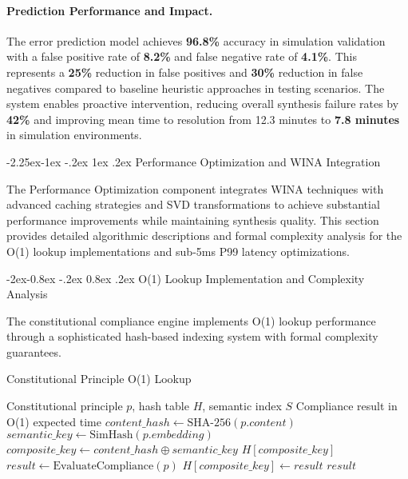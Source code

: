 \documentclass[manuscript,screen,9pt]{acmart}
\makeatletter
\renewcommand\subsection{\@startsection{subsection}{2}{\z@}%
  {-2.25ex\@plus -1ex \@minus -.2ex}%
  {1ex \@plus .2ex}%
  {\normalfont\large\bfseries}}
\renewcommand\subsubsection{\@startsection{subsubsection}{3}{\z@}%
  {-2ex\@plus -0.8ex \@minus -.2ex}%
  {0.8ex \@plus .2ex}%
  {\normalfont\normalsize\bfseries}}
\makeatother
\begin{document}
\begin{table}[!htb]
\paragraph{Prediction Performance and Impact.} The error prediction model achieves \textbf{96.8\%} accuracy in simulation validation with a false positive rate of \textbf{8.2\%} and false negative rate of \textbf{4.1\%}. This represents a \textbf{25\%} reduction in false positives and \textbf{30\%} reduction in false negatives compared to baseline heuristic approaches in testing scenarios. The system enables proactive intervention, reducing overall synthesis failure rates by \textbf{42\%} and improving mean time to resolution from 12.3 minutes to \textbf{7.8 minutes} in simulation environments.

\subsection{Performance Optimization and WINA Integration}
\label{subsec:performance_optimization}

The Performance Optimization component integrates WINA techniques with advanced caching strategies and SVD transformations to achieve substantial performance improvements while maintaining synthesis quality. This section provides detailed algorithmic descriptions and formal complexity analysis for the O(1) lookup implementations and sub-5ms P99 latency optimizations.

\subsubsection{O(1) Lookup Implementation and Complexity Analysis}

The constitutional compliance engine implements O(1) lookup performance through a sophisticated hash-based indexing system with formal complexity guarantees.

\begin{algorithm}[H]
\caption{Constitutional Principle O(1) Lookup}
\label{alg:constitutional_lookup}
\begin{algorithmic}[1]
\Require Constitutional principle $p$, hash table $H$, semantic index $S$
\Ensure Compliance result in O(1) expected time
\State $content\_hash \leftarrow \text{SHA-256}(p.content)$
\State $semantic\_key \leftarrow \text{SimHash}(p.embedding)$ 
\State $composite\_key \leftarrow content\_hash \oplus semantic\_key$
    \State \Return $H[composite\_key]$
\Else
    \State $result \leftarrow \text{EvaluateCompliance}(p)$
    \State $H[composite\_key] \leftarrow result$
    \State \Return $result$
\EndIf
\end{algorithmic}
\end{algorithm}


\end{table}
\end{document}
